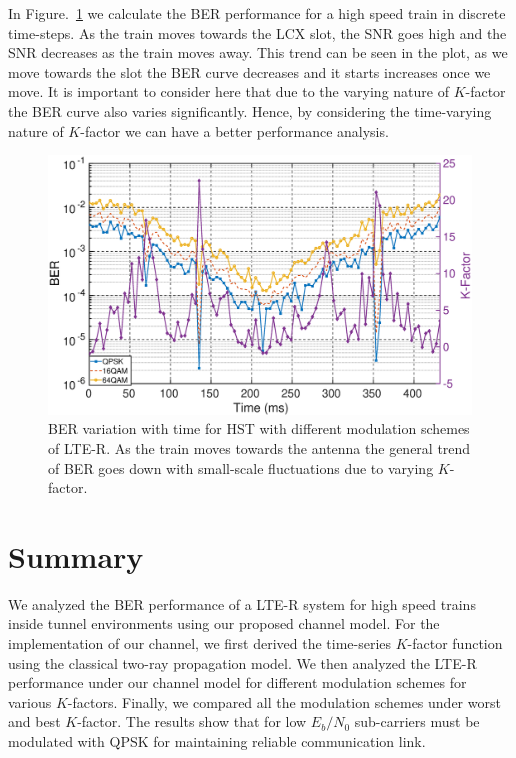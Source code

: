 In Figure.~\ref{kfactorber} we calculate the BER performance for a high speed train in discrete time-steps. As the train moves towards the LCX slot, the SNR goes high and the SNR decreases as the train moves away. This trend can be seen in the plot, as we move towards the slot the BER curve decreases and it starts increases once we move. It is important to consider here that due to the varying nature of $K$-factor the BER curve also varies significantly. Hence, by considering the time-varying nature of $K$-factor we can have a better performance analysis.

\begin{figure}[!ht]
\centering
\includegraphics[width=\textwidth,keepaspectratio]{images/Gill/lte_figs/kfactorcontinuous.eps} 
\caption{BER variation with time for HST with different modulation schemes of LTE-R. As the train moves towards
the antenna the general trend of BER goes down with small-scale fluctuations due to varying $K$-factor.}
\label{kfactorber}
\end{figure}

\section{Summary}
We analyzed the BER performance of a LTE-R system for high speed trains inside tunnel environments using our proposed channel model. For the implementation of our channel, we first derived the time-series $K$-factor function using the classical two-ray propagation model. We then analyzed the LTE-R performance under our channel model for different modulation schemes for various $K$-factors. Finally, we compared all the modulation schemes under worst and best $K$-factor. The results show that for low $E_b/N_0$ sub-carriers must be modulated with QPSK for maintaining reliable communication link.

